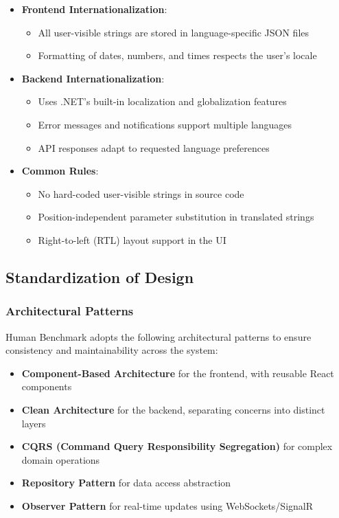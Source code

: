 \begin{itemize}
    \item \textbf{Frontend Internationalization}:
    \begin{itemize}
        \item All user-visible strings are stored in language-specific JSON files
        \item Formatting of dates, numbers, and times respects the user's locale
    \end{itemize}
    
    \item \textbf{Backend Internationalization}:
    \begin{itemize}
        \item Uses .NET's built-in localization and globalization features
        \item Error messages and notifications support multiple languages
        \item API responses adapt to requested language preferences
    \end{itemize}
    
    \item \textbf{Common Rules}:
    \begin{itemize}
        \item No hard-coded user-visible strings in source code
        \item Position-independent parameter substitution in translated strings
        \item Right-to-left (RTL) layout support in the UI
    \end{itemize}
\end{itemize}

\subsection{Standardization of Design}

\subsubsection{Architectural Patterns}

Human Benchmark adopts the following architectural patterns to ensure consistency and maintainability across the system:

\begin{itemize}
    \item \textbf{Component-Based Architecture} for the frontend, with reusable React components
    \item \textbf{Clean Architecture} for the backend, separating concerns into distinct layers
    \item \textbf{CQRS (Command Query Responsibility Segregation)} for complex domain operations
    \item \textbf{Repository Pattern} for data access abstraction
    \item \textbf{Observer Pattern} for real-time updates using WebSockets/SignalR
\end{itemize}

